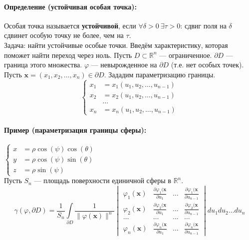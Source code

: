 \paragraph{Определение (устойчивая особая точка):} Особая точка называется \textbf{устойчивой}, если $\forall \delta > 0 \ \exists \tau > 0$: сдвиг поля на $\delta$ сдвинет особую точку не более, чем на $\tau$.
\\

Задача: найти устойчивые особые точки.
Введём характеристику, которая поможет найти переход через ноль.
Пусть $D \subset \mathbb{R}^n$ --- ограниченное. $\partial D$ --- граница этого множества. $\varphi$ --- невырожденное на $\partial D$ (т.е. нет особых точек).
Пусть $\mathbf{x}=(x_1,x_2,\hdots,x_n) \in \partial D$. Зададим параметризацию границы.
\[
\left\{
\begin{aligned}
x_1 &= x_1(u_1, u_2, \dots, u_{n-1}) \\
x_2 &= x_2(u_1, u_2, \dots, u_{n-1}) \\
&\hdots \\
x_n &= x_n(u_1, u_2, \dots, u_{n-1})
\end{aligned}
\right.
\]
\paragraph{Пример (параметризация границы сферы):} $\left\{
\begin{aligned}
x &= \rho \cos(\psi) \cos(\theta) \\
y &= \rho \cos(\psi) \sin(\theta) \\
z &= \rho \sin(\psi)
\end{aligned}
\right.$
\\

Пусть $S_n$ --- площадь поверхности единичной сферы в $\mathbb{R}^n$.
\[
\gamma(\varphi, \partial D) = \frac{1}{S_n} \int\limits_{\partial D} \frac{1}{\|\varphi(\mathbf{x})\|^n} \begin{vmatrix} \varphi_1(\mathbf{x}) & \frac{\partial \varphi_1(\mathbf{x}}{\partial u_1}  &\hdots & \frac{\partial \varphi_1(\mathbf{x}}{\partial u_{n-1}} \\ \varphi_2(\mathbf{x}) & \frac{\partial \varphi_2(\mathbf{x}}{\partial u_1}  &\hdots & \frac{\partial \varphi_2(\mathbf{x}}{\partial u_{n-1}} \\ \hdots & \hdots & \hdots & \hdots \\ \varphi_n(\mathbf{x}) & \frac{\partial \varphi_n(\mathbf{x}}{\partial u_1}  &\hdots & \frac{\partial \varphi_n(\mathbf{x}}{\partial u_{n-1}} \end{vmatrix} du_1du_2\hdots du_n
\]
